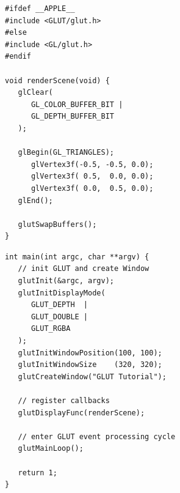 \begin{frame}[fragile, t]
%
%
\begin{codebox}
\begin{verbatim}
#ifdef __APPLE__
#include <GLUT/glut.h>
#else
#include <GL/glut.h>
#endif

void renderScene(void) {
   glClear(
      GL_COLOR_BUFFER_BIT | 
      GL_DEPTH_BUFFER_BIT
   );

   glBegin(GL_TRIANGLES);
      glVertex3f(-0.5, -0.5, 0.0);
      glVertex3f( 0.5,  0.0, 0.0);
      glVertex3f( 0.0,  0.5, 0.0);
   glEnd();

   glutSwapBuffers();
}
\end{verbatim}
\end{codebox}
%
\begin{codebox}
\begin{verbatim}
int main(int argc, char **argv) {
   // init GLUT and create Window
   glutInit(&argc, argv);
   glutInitDisplayMode(
      GLUT_DEPTH  | 
      GLUT_DOUBLE | 
      GLUT_RGBA
   );
   glutInitWindowPosition(100, 100);
   glutInitWindowSize    (320, 320);
   glutCreateWindow("GLUT Tutorial");

   // register callbacks
   glutDisplayFunc(renderScene);

   // enter GLUT event processing cycle
   glutMainLoop();

   return 1;
}
\end{verbatim}
\end{codebox}
%
\end{frame}


